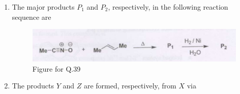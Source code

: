 \documentclass[12pt]{article}
\begin{document}
\begin{enumerate}
\item The major products $P_1$ and $P_2$, respectively, in the following reaction sequence are

\begin{figure}[H]
    \includegraphics[width=0.5\columnwidth]{figs/q39.png}
    \caption{Figure for Q.39}
    \label{fig:q39}
\end{figure}    \hfill{}

\item The products $Y$ and $Z$ are formed, respectively, from $X$ via


\end{enumerate}
\end{document}

